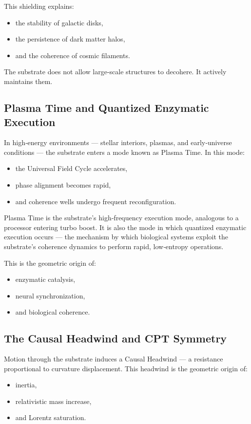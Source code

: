 \documentclass[reprint,amsmath,amssymb,aps,prl,floatfix]{revtex4-2}
\begin{document}
\begin{itemize}
This shielding explains:
\begin{itemize}
\item the stability of galactic disks,  
\item the persistence of dark matter halos,  
\item and the coherence of cosmic filaments.
\end{itemize}
\medskip

The substrate does not allow large‑scale structures to decohere.  
It actively maintains them.

\subsection{Plasma Time and Quantized Enzymatic Execution}

In high‑energy environments — stellar interiors, plasmas, and early‑universe conditions — the substrate enters a mode known as Plasma Time. In this mode:

\begin{itemize}
\item the Universal Field Cycle accelerates,  
\item phase alignment becomes rapid,  
\item and coherence wells undergo frequent reconfiguration.
\end{itemize}

Plasma Time is the substrate’s high‑frequency execution mode, analogous to a processor entering turbo boost. It is also the mode in which quantized enzymatic execution occurs — the mechanism by which biological systems exploit the substrate’s coherence dynamics to perform rapid, low‑entropy operations.

This is the geometric origin of:
\begin{itemize}
\item enzymatic catalysis,  
\item neural synchronization,  
\item and biological coherence.
\end{itemize}



\subsection{The Causal Headwind and CPT Symmetry}

Motion through the substrate induces a Causal Headwind — a resistance proportional to curvature displacement. This headwind is the geometric origin of:
\begin{itemize}
\item inertia,  
\item relativistic mass increase,  
\item and Lorentz saturation.
\end{itemize}


\end{itemize}
\end{document}

